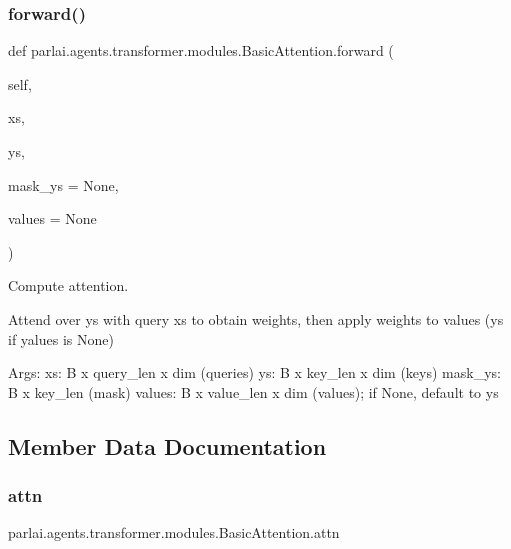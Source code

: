 \subsubsection{\texorpdfstring{forward()}{forward()}}
{\footnotesize\ttfamily def parlai.\+agents.\+transformer.\+modules.\+Basic\+Attention.\+forward (\begin{DoxyParamCaption}\item[{}]{self,  }\item[{}]{xs,  }\item[{}]{ys,  }\item[{}]{mask\+\_\+ys = {\ttfamily None},  }\item[{}]{values = {\ttfamily None} }\end{DoxyParamCaption})}

\begin{DoxyVerb}Compute attention.

Attend over ys with query xs to obtain weights, then apply weights to
values (ys if yalues is None)

Args:
    xs: B x query_len x dim (queries)
    ys: B x key_len x dim (keys)
    mask_ys: B x key_len (mask)
    values: B x value_len x dim (values); if None, default to ys
\end{DoxyVerb}
 

\subsection{Member Data Documentation}
\mbox{\label{classparlai_1_1agents_1_1transformer_1_1modules_1_1BasicAttention_a04d74d5efbfdf47d36aff30331775368}} 
\subsubsection{\texorpdfstring{attn}{attn}}
{\footnotesize\ttfamily parlai.\+agents.\+transformer.\+modules.\+Basic\+Attention.\+attn}

\mbox{\label{classparlai_1_1agents_1_1transformer_1_1modules_1_1BasicAttention_abed26e42fa2293f14cbbcf51c090794c}} 
